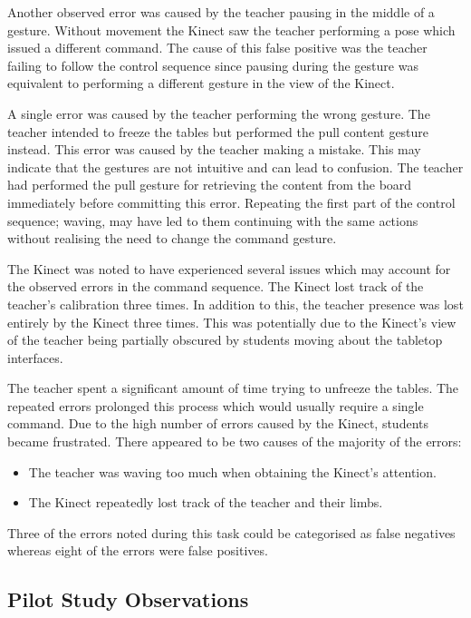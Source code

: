 \documentclass[link]{IWCOMP}
\begin{document}
Another observed error was caused by the teacher pausing in the middle of a gesture.
Without movement the Kinect saw the teacher performing a pose which issued a different command.
The cause of this false positive was the teacher failing to follow the control sequence since pausing during the gesture was equivalent to performing a different gesture in the view of the Kinect.

A single error was caused by the teacher performing the wrong gesture.
The teacher intended to freeze the tables but performed the pull content gesture instead. 
This error was caused by the teacher making a mistake.
This may indicate that the gestures are not intuitive and can lead to confusion.
The teacher had performed the pull gesture for retrieving the content from the board immediately before committing this error.
Repeating the first part of the control sequence; waving, may have led to them continuing with the same actions without realising the need to change the command gesture.

The Kinect was noted to have experienced several issues which may account for the observed errors in the command sequence.
The Kinect lost track of the teacher's calibration three times.
In addition to this, the teacher presence was lost entirely by the Kinect three times.
This was potentially due to the Kinect's view of the teacher being partially obscured by students moving about the tabletop interfaces.

The teacher spent a significant amount of time trying to unfreeze the tables.
The repeated errors prolonged this process which would usually require a single command.
Due to the high number of errors caused by the Kinect, students became frustrated.
There appeared to be two causes of the majority of the errors:

\begin{itemize}
\item The teacher was waving too much when obtaining the Kinect's attention.
\item The Kinect repeatedly lost track of the teacher and their limbs. 
\end{itemize}

Three of the errors noted during this task could be categorised as false negatives whereas eight of the errors were false positives.

\subsection{Pilot Study Observations}
\label{subsec:pilotdiscussion}
\end{document}
